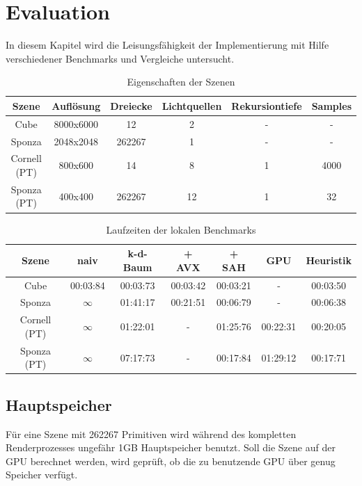 \chapter{Evaluation}
\label{ch:evaluation}
In diesem Kapitel wird die Leisungsfähigkeit der Implementierung mit Hilfe verschiedener Benchmarks und Vergleiche untersucht.

\begin{table}[h]
	\centering
	\caption{Eigenschaften der Szenen}
	\label{tbl:local_scenes}
	\begin{tabular}{|c|c|c|c|c|c|}
		\hline
		Szene 			& Auflösung & Dreiecke	& Lichtquellen & Rekursiontiefe & Samples \\ \hline
		Cube  			& 8000x6000 & 12 	& 2	& -	& -			\\
		Sponza  		& 2048x2048 & 262267 	& 1 & -	& -			\\
        Cornell (PT) 	& 800x600 & 14 	& 8			& 1	& 4000	\\
		Sponza (PT) 	& 400x400 & 262267 & 12			& 1	& 32	\\
		\hline
	\end{tabular}
\end{table}

\begin{table}[h]
	\centering
	\caption{Laufzeiten der lokalen Benchmarks}
	\label{tbl:local_bench}
	\begin{tabular}{|c|c|c|c|c|c|c|}
		\hline
		Szene 			& naiv		& k-d-Baum	& + AVX		& + SAH		& GPU 		& Heuristik \\ \hline
		Cube  			& 00:03:84 	& 00:03:73  & 00:03:42	& 00:03:21	& -			& 00:03:50	\\
		Sponza  		& $\infty$ 	& 01:41:17 	& 00:21:51  & 00:06:79	& -			& 00:06:38	\\
		Cornell (PT) 	& $\infty$ 	& 01:22:01 	& -			& 01:25:76	& 00:22:31	& 00:20:05	\\
		Sponza (PT) 	& $\infty$ 	& 07:17:73	& -			& 00:17:84	& 01:29:12	& 00:17:71	\\
		\hline
	\end{tabular}
\end{table}

\section{Hauptspeicher}
Für eine Szene mit 262267 Primitiven wird während des kompletten Renderprozesses ungefähr 1GB Hauptspeicher benutzt. Soll die Szene auf der GPU berechnet werden, wird geprüft, ob die zu benutzende GPU über genug Speicher verfügt. 

